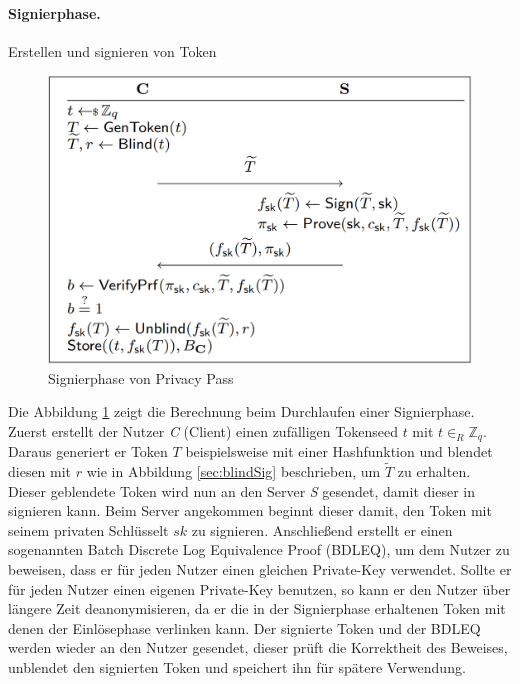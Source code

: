 \documentclass[
	fontsize=12pt,
	headings=small,
	parskip=half,           %
	bibliography=totoc,
	numbers=noenddot,       %
	open=any,               %
]{scrreprt}
\begin{document}
\paragraph{Signierphase.} Erstellen und signieren von Token
\begin{figure}[H]
    \centering
    \includegraphics[width=0.5\linewidth]{pp_signphase.png}
    \caption{Signierphase von Privacy Pass \cite{pp-davidson2018privacy}}
    \label{fig:pp-signingphase}
\end{figure}
Die Abbildung \ref{fig:pp-signingphase} zeigt die Berechnung beim Durchlaufen einer Signierphase. Zuerst erstellt der Nutzer \textit{C} (Client) einen zufälligen Tokenseed $t$ mit $t {\in}_R \mathbb{Z}_q $. Daraus generiert er Token $T$ beispielsweise mit einer Hashfunktion und blendet diesen mit $r$ wie in Abbildung \ref{sec:blindSig} beschrieben, um $\widetilde{T}$ zu erhalten. Dieser geblendete Token wird nun an den Server \textit{S} gesendet, damit dieser in signieren kann. Beim Server angekommen beginnt dieser damit, den Token mit seinem privaten Schlüsselt $sk$ zu signieren. Anschließend erstellt er einen sogenannten Batch Discrete Log Equivalence Proof (BDLEQ), um dem Nutzer zu beweisen, dass er für jeden Nutzer einen gleichen Private-Key verwendet. Sollte er für jeden Nutzer einen eigenen Private-Key benutzen, so kann er den Nutzer über längere Zeit deanonymisieren, da er die in der Signierphase erhaltenen Token mit denen der Einlösephase verlinken kann. Der signierte Token und der BDLEQ werden wieder an den Nutzer gesendet, dieser prüft die Korrektheit des Beweises, unblendet den signierten Token und speichert ihn für spätere Verwendung. 
\end{document}
